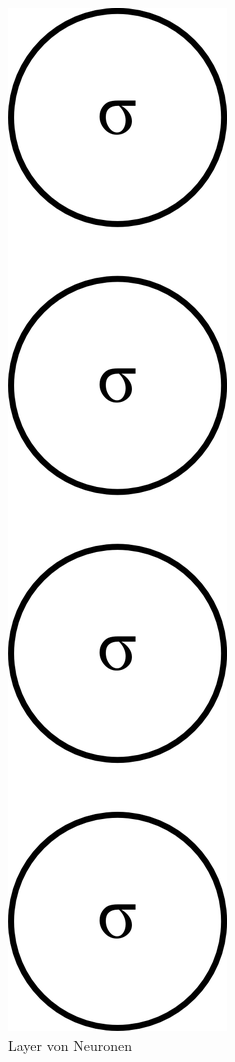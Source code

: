 \begin{figure}
	\centering
	\includegraphics[scale=1]{images/neuron-layer.png}
	\caption{Layer von Neuronen}
	\label{fig:neuron-layer}
\end{figure}

